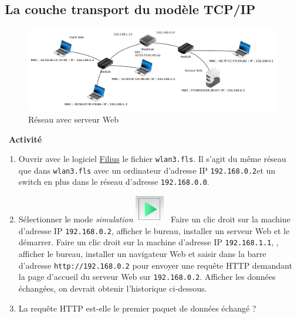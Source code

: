 \documentclass[
  11pt,
]{article}
\newcommand{\passthrough}[1]{#1}
\providecommand{\tightlist}{%
  \setlength{\itemsep}{0pt}\setlength{\parskip}{0pt}}
\newcounter{activite}
\newenvironment{activite}[1]
{\par \medskip   \noindent   \addtocounter{activite}{1}
\begin{bclogo}[arrondi =0.1,   noborder = true, logo=\bcvelo, marge=4]{~\textbf{Activité} \textbf{\theactivite} {\itshape #1} }  \par}
{
\end{bclogo}
 \par \bigskip }
\newcounter{def}
\newcounter{logi}
\newcounter{histo}
\begin{document}
\hypertarget{la-couche-transport-du-moduxe8le-tcpip}{%
\subsection{La couche transport du modèle
TCP/IP}\label{la-couche-transport-du-moduxe8le-tcpip}}

\begin{figure}
\centering
\includegraphics{images/wlan3.png}
\caption{Réseau avec serveur Web}
\end{figure}

\begin{activite}{}

\begin{enumerate}
\def\labelenumi{\arabic{enumi}.}
\tightlist
\item
  Ouvrir avec le logiciel
  \href{https://www.lernsoftware-filius.de/Herunterladen}{Filius} le
  fichier \passthrough{\lstinline!wlan3.fls!}. Il s'agit du même réseau
  que dans \passthrough{\lstinline!wlan3.fls!} avec un ordinateur
  d'adresse IP \passthrough{\lstinline!192.168.0.2!}et un switch en plus
  dans le réseau d'adresse \passthrough{\lstinline!192.168.0.0!}.
\item
  Sélectionner le mode \emph{simulation}
  \includegraphics[width=0.1\textwidth,height=\textheight]{images/filius-simulation.png}~
  Faire un clic droit sur la machine d'adresse IP
  \passthrough{\lstinline!192.168.0.2!}, afficher le bureau, installer
  un serveur Web et le démarrer. Faire un clic droit sur la machine
  d'adresse IP \passthrough{\lstinline!192.168.1.1!}, , afficher le
  bureau, installer un navigateur Web et saisir dans la barre d'adresse
  \passthrough{\lstinline!http://192.168.0.2!} pour envoyer une requête
  HTTP demandant la page d'accueil du serveur Web sur
  \passthrough{\lstinline!192.168.0.2!}. Afficher les données échangées,
  on devrait obtenir l'historique ci-dessous.
\item
  La requête HTTP est-elle le premier paquet de données échangé ?
\end{enumerate}

\end{activite}
\end{document}

